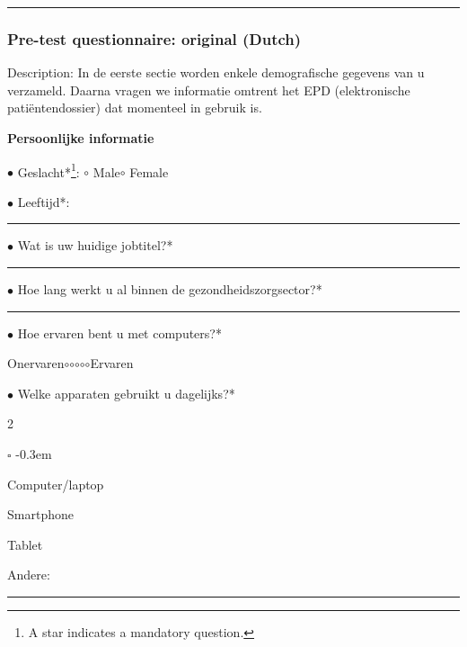     \vspace{10pt}
    \hrule
    \vspace{6pt}

    \subsubsection{Pre-test questionnaire: original (Dutch)}\label{appendix_pretest}

    Description: In de eerste sectie worden enkele demografische gegevens van u verzameld. Daarna vragen we informatie omtrent het EPD (elektronische pati\"{e}ntendossier) dat momenteel in gebruik is.\bigskip

    \noindent\textbf{Persoonlijke informatie}\bigskip

    \noindent \(\bullet\) Geslacht*\footnote{A star indicates a mandatory question.}: \hspace{10pt} \(\circ\) Male\hspace{10pt}\(\circ\) Female\medskip

    \noindent \(\bullet\) Leeftijd*:\hspace{6pt}\rule{0.1\textwidth}{0.4pt}\medskip

    \noindent \(\bullet\) Wat is uw huidige jobtitel?*\hspace{6pt}\rule{0.4\textwidth}{0.4pt}\medskip

    \noindent \(\bullet\) Hoe lang werkt u al binnen de gezondheidszorgsector?*\hspace{6pt}\rule{0.2\textwidth}{0.4pt}\medskip

    \noindent \(\bullet\) Hoe ervaren bent u met computers?*
    \vspace{-6pt}
    \begin{center}
    Onervaren\hspace{20pt}\(\circ\)\hspace{20pt}\(\circ\)\hspace{20pt}\(\circ\)\hspace{20pt}\(\circ\)\hspace{20pt}\(\circ\)\hspace{20pt}Ervaren
    \end{center}

    \noindent \(\bullet\) Welke apparaten gebruikt u dagelijks?*
    \vspace{-8pt}
    \begin{multicols}{2}
        \begin{list}{\(\square\)}{} 
            \itemsep-0.3em 
            \item Computer/laptop
            \item Smartphone
            \item Tablet
            \item Andere: \rule{0.2\textwidth}{0.4pt}
        \end{list}
    \end{multicols}

